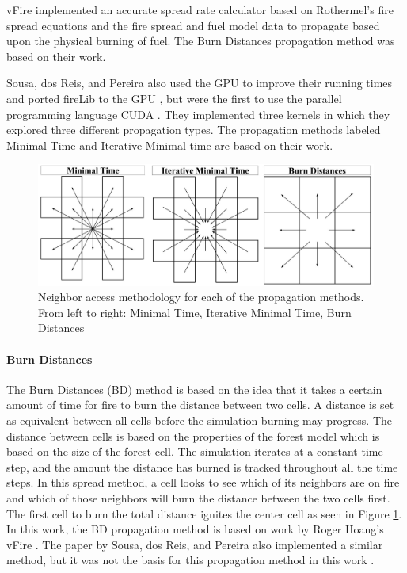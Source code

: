 vFire implemented an accurate spread rate calculator based on Rothermel's fire spread equations and the fire spread and fuel model data to propagate based upon the physical burning of fuel. The Burn Distances propagation method was based on their work.

Sousa, dos Reis, and Pereira also used the GPU to improve their running times and ported fireLib to the GPU \cite{gpufire}, but were the first to use the parallel programming language CUDA \cite{cuda}. They implemented three kernels in which they explored three different propagation types. The propagation methods labeled Minimal Time and Iterative Minimal time are based on their work. 

\begin{figure}%
\centering
\includegraphics[width=\linewidth]{figures/background/spread_methods.PNG}
\caption{Neighbor access methodology for each of the propagation methods. From left to right: Minimal Time, Iterative Minimal Time, Burn Distances}
\label{fig:spreadTypes}
\end{figure}

\paragraph{Burn Distances}
The Burn Distances (BD) method is based on the idea that it takes a certain amount of time for fire to burn the distance between two cells. A distance is set as equivalent between all cells before the simulation burning may progress. The distance between cells is based on the properties of the forest model which is based on the size of the forest cell. The simulation iterates at a constant time step, and the amount the distance has burned is tracked throughout all the time steps. In this spread method, a cell looks to see which of its neighbors are on fire and which of those neighbors will burn the distance between the two cells first. The first cell to burn the total distance ignites the center cell as seen in Figure \ref{fig:spreadTypes}. In this work, the BD propagation method is based on work by Roger Hoang's vFire \cite{vFire, rogerthesis}. The paper by Sousa, dos Reis, and Pereira also implemented a similar method, but it was not the basis for this propagation method in this work \cite{gpufire}.


